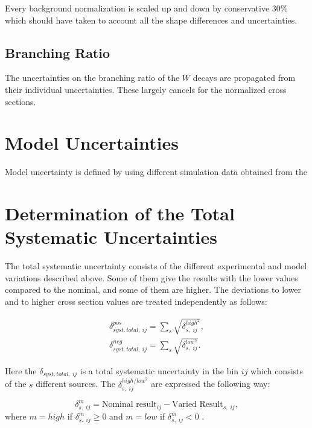 Every background normalization is scaled up and down by conservative 30$\%$ which should have taken to account all the shape differences
and uncertainties.

\subsection{Branching Ratio}

The uncertainties on the branching ratio of the $W$ decays are propagated from their individual uncertainties.
These largely cancels for the normalized cross sections.
\section{Model Uncertainties}

Model uncertainty is defined by using different simulation data obtained from the 

\section{Determination of the Total Systematic Uncertainties}

The total systematic uncertainty consists of the different experimental and model variations described above.
Some of them give the results with the lower values compared to the nominal, and some of them are higher.
The deviations to lower and to higher cross section values are treated independently as follows:

\begin{align}
 \delta_{syst.\,total,\:ij}^{pos} = \sum_{s}\sqrt{\delta_{s,\;ij}^{high^{2}}}, \\
 \delta_{syst.\,total,\:ij}^{neg} = \sum_{s} \sqrt{\delta_{s,\;ij}^{low^{2}}}.
\end{align}

Here the $\delta_{syst.\,total,\:ij}$ is a total systematic uncertainty in the bin $ij$ which consists of the
$s$ different sources. The $\delta_{s,\;ij}^{high/low^{2}}$ are expressed the following way:

\begin{equation}
 \delta_{s,\;ij}^{m} = \textrm{Nominal result}_{ij} - \textrm{Varied Result}_{s,\;ij}, 
\end{equation}
where $m = high$ if $\delta_{s,\;ij}^{m} \geq 0$ and $m = low$ if $\delta_{s,\;ij}^{m} < 0$ . 

